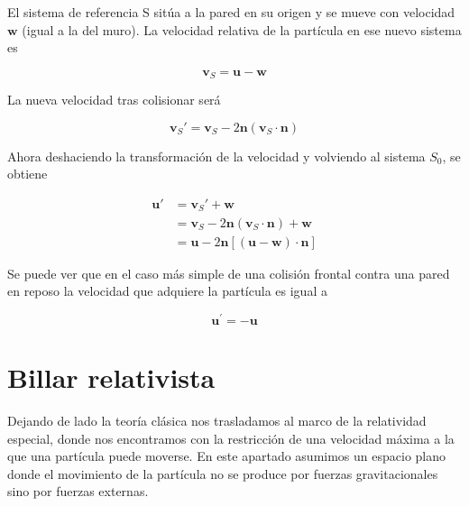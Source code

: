 \vspace{3mm}

El sistema de referencia S sitúa a la pared en su origen y se mueve con velocidad \( \mathbf{w} \) (igual a la del muro). La velocidad relativa de la partícula en ese nuevo sistema es

\begin{equation}
    \mathbf{v}_S = \mathbf{u} - \mathbf{w}
\end{equation}

La nueva velocidad tras colisionar será

\begin{equation}
    \mathbf{v}_S' = \mathbf{v}_S - 2\mathbf{n}(\mathbf{v}_S \cdot \mathbf{n})
\end{equation}

Ahora deshaciendo la transformación de la velocidad y volviendo al sistema \( S_0 \), se obtiene

\begin{align}
    \mathbf{u}' &= \mathbf{v}_S' + \mathbf{w} \\
    &= \mathbf{v}_S - 2\mathbf{n}(\mathbf{v}_S \cdot \mathbf{n}) + \mathbf{w} \\
    &= \mathbf{u} - 2\mathbf{n}\left[(\mathbf{u} - \mathbf{w}) \cdot \mathbf{n}\right]
\end{align}

\vspace{3mm}

Se puede ver que en el caso más simple de una colisión frontal contra una pared en reposo la velocidad que adquiere la partícula es igual a 

\begin{equation}\label{eq:velocidad_inversa_clasica}
    \mathbf{u}^\prime = - \mathbf{u}
\end{equation}

\section{Billar relativista}

Dejando de lado la teoría clásica nos trasladamos al marco de la relatividad especial, donde nos encontramos con la restricción de una velocidad máxima a la que una partícula puede moverse. En este apartado asumimos un espacio plano donde el movimiento de la partícula no se produce por fuerzas gravitacionales sino por fuerzas externas. 

\vspace{3mm}

